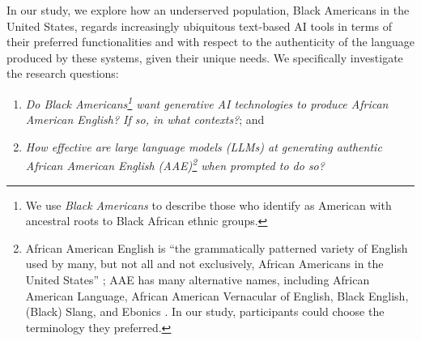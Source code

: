 In our study, we explore how an underserved population,  Black Americans in the United States, regards increasingly ubiquitous text-based AI tools in terms of their preferred functionalities and with respect to the authenticity of the language produced by these systems, given their unique needs.
We specifically investigate the research questions:
\begin{enumerate}
\item \emph{Do Black Americans\footnote{%
We use \textit{Black Americans} to describe those who identify as American with ancestral roots to Black African ethnic groups.}
want generative AI technologies to produce African American English? If so, in what contexts?}; and
\item \emph{How effective are large language models (LLMs) at generating authentic African American English (AAE)\footnote{%
African American English is ``the grammatically patterned variety of English used by many, but not all and not exclusively, African Americans in the United States'' \cite{grieser2022black}; AAE has many alternative names, including African American Language, African American Vernacular of English, Black English, (Black) Slang, and Ebonics
\cite{green2002african,wolfram2015american,rickford2016language,king2020african,becker2013ethnolect}. In our study, participants could choose the terminology they preferred. %
}
when prompted to do so?}
\end{enumerate}


